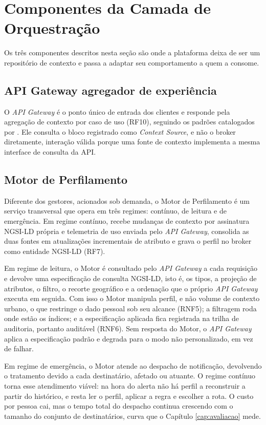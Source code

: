 \section{Componentes da Camada de Orquestração}
\label{sec:orquestracao}

Os três componentes descritos nesta seção são onde a plataforma deixa de ser um repositório de contexto e passa a adaptar seu comportamento a quem a consome.

\subsection{API Gateway agregador de experiência}

O \textit{API Gateway} é o ponto único de entrada dos clientes e responde pela agregação de contexto por caso de uso (RF10), seguindo os padrões catalogados por . Ele consulta o bloco registrado como \textit{Context Source}, e não o broker diretamente, interação válida porque uma fonte de contexto implementa a mesma interface de consulta da API.

\subsection{Motor de Perfilamento}

Diferente dos gestores, acionados sob demanda, o Motor de Perfilamento é um serviço transversal que opera em três regimes: contínuo, de leitura e de emergência. Em regime contínuo, recebe mudanças de contexto por assinatura NGSI-LD própria e telemetria de uso enviada pelo \textit{API Gateway}, consolida as duas fontes em atualizações incrementais de atributo e grava o perfil no broker como entidade NGSI-LD (RF7).

Em regime de leitura, o Motor é consultado pelo \textit{API Gateway} a cada requisição e devolve uma especificação de consulta NGSI-LD, isto é, os tipos, a projeção de atributos, o filtro, o recorte geográfico e a ordenação que o próprio \textit{API Gateway} executa em seguida. Com isso o Motor manipula perfil, e não volume de contexto urbano, o que restringe o dado pessoal sob seu alcance (RNF5); a filtragem roda onde estão os índices; e a especificação aplicada fica registrada na trilha de auditoria, portanto auditável (RNF6). Sem resposta do Motor, o \textit{API Gateway} aplica a especificação padrão e degrada para o modo não personalizado, em vez de falhar.

Em regime de emergência, o Motor atende ao despacho de notificação, devolvendo o tratamento devido a cada destinatário, afetado ou atuante. O regime contínuo torna esse atendimento viável: na hora do alerta não há perfil a reconstruir a partir do histórico, e resta ler o perfil, aplicar a regra e escolher a rota. O custo por pessoa cai, mas o tempo total do despacho continua crescendo com o tamanho do conjunto de destinatários, curva que o Capítulo \ref{cap:avaliacao} mede.

